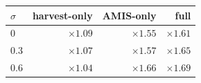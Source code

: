 \begin{tabular}{l rrr}
\toprule
\(\sigma\) & harvest-only & AMIS-only & full \\
\midrule
0   & $\times 1.09$ & $\times 1.55$ & $\times 1.61$ \\
0.3 & $\times 1.07$ & $\times 1.57$ & $\times 1.65$ \\
0.6 & $\times 1.04$ & $\times 1.66$ & $\times 1.69$ \\
\bottomrule
\end{tabular}
